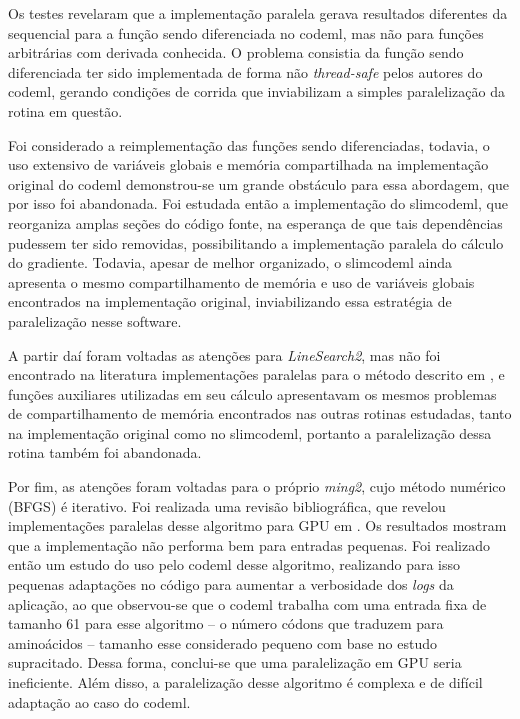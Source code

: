 \documentclass[cic,tc]{iiufrgs}
\begin{document}
Os testes revelaram que a implementação paralela gerava resultados diferentes
da sequencial para a função sendo diferenciada no codeml, mas não para funções
arbitrárias com derivada conhecida. O problema consistia da função sendo
diferenciada ter sido implementada de forma não \textit{thread-safe} pelos
autores do codeml, gerando condições de corrida que inviabilizam a simples
paralelização da rotina em questão.

Foi considerado a reimplementação das funções sendo diferenciadas, todavia, o
uso extensivo de variáveis globais e memória compartilhada na implementação
original do codeml demonstrou-se um grande obstáculo para essa abordagem, que
por isso foi abandonada. Foi estudada então a implementação do slimcodeml, que
reorganiza amplas seções do código fonte, na esperança de que tais
dependências pudessem ter sido removidas, possibilitando a implementação
paralela do cálculo do gradiente. Todavia, apesar de melhor organizado, o
slimcodeml ainda apresenta o mesmo compartilhamento de memória e uso de
variáveis globais encontrados na implementação original, inviabilizando essa
estratégia de paralelização nesse software.

A partir daí foram voltadas as atenções para \textit{LineSearch2}, mas não foi
encontrado na literatura implementações paralelas para o método descrito em
\cite{wolfe1978numerical}, e funções auxiliares utilizadas em seu cálculo
apresentavam os mesmos problemas de compartilhamento de memória encontrados nas
outras rotinas estudadas, tanto na implementação original como no slimcodeml,
portanto a paralelização dessa rotina também foi abandonada.

Por fim, as atenções foram voltadas para o próprio \textit{ming2}, cujo método
numérico (BFGS) é iterativo. Foi realizada uma revisão bibliográfica, que
revelou implementações paralelas desse algoritmo para GPU em
\cite{fei2014parallel}. Os resultados mostram que a implementação não
performa bem para entradas pequenas. Foi realizado então um estudo do uso pelo
codeml desse algoritmo, realizando para isso pequenas adaptações no código para
aumentar a verbosidade dos \textit{logs} da aplicação, ao que observou-se  que
o codeml trabalha com uma entrada fixa de tamanho 61 para esse algoritmo -- o
número códons que traduzem para aminoácidos -- tamanho esse considerado pequeno
com base no estudo supracitado. Dessa forma, conclui-se que uma paralelização
em GPU seria ineficiente. Além disso, a paralelização desse algoritmo é
complexa e de difícil adaptação ao caso do codeml.
\end{document}
